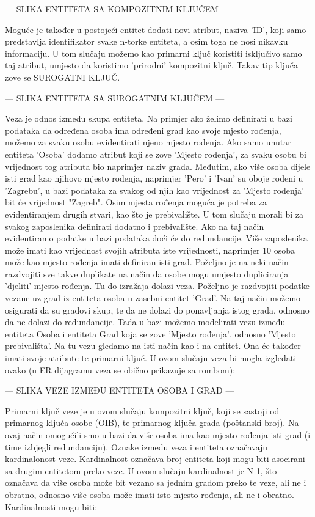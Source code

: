 \documentclass[times, utf8, zavrsni]{fer}
\begin{document}
--- SLIKA ENTITETA SA KOMPOZITNIM KLJUČEM ---

Moguće je također u postojeći entitet dodati novi atribut, naziva 'ID', koji samo predstavlja identifikator svake n-torke entiteta, a osim toga ne nosi nikavku informaciju. U tom slučaju možemo kao primarni ključ koristiti isključivo samo taj atribut, umjesto da koristimo 'prirodni' kompozitni ključ. Takav tip ključa zove se SUROGATNI KLJUČ.

--- SLIKA ENTITETA SA SUROGATNIM KLJUČEM ---

Veza je odnos između skupa entiteta.
Na primjer ako želimo definirati u bazi podataka da određena osoba ima određeni grad kao svoje mjesto rođenja, možemo za svaku osobu evidentirati njeno mjesto rođenja. Ako samo unutar entiteta 'Osoba' dodamo atribut koji se zove 'Mjesto rođenja', za svaku osobu bi vrijednost tog atributa bio naprimjer naziv grada. Međutim, ako više osoba dijele isti grad kao njihovo mjesto rođenja, naprimjer 'Pero' i 'Ivan' su oboje rođeni u 'Zagrebu', u bazi podataka za svakog od njih kao vrijednost za 'Mjesto rođenja' bit će vrijednost "Zagreb". 
Osim mjesta rođenja moguća je potreba za evidentiranjem drugih stvari, kao što je prebivalište. U tom slučaju morali bi za svakog zaposlenika definirati dodatno i prebivalište. Ako na taj način evidentiramo podatke u bazi podataka doći će do redundancije. Više zaposlenika može imati kao vrijednost svojih atributa iste vrijednosti, naprimjer 10 osoba može kao mjesto rođenja imati definiran isti grad. Poželjno je na neki način razdvojiti sve takve duplikate na način da osobe mogu umjesto dupliciranja 'djeliti' mjesto rođenja. 
Tu do izražaja dolazi veza. Poželjno je razdvojiti podatke vezane uz grad iz entiteta osoba u zasebni entitet 'Grad'. Na taj način možemo osigurati da su gradovi skup, te da ne dolazi do ponavljanja istog grada, odnosno da ne dolazi do redundancije. Tada u bazi možemo modelirati vezu između entiteta Osoba i entiteta Grad koja se zove 'Mjesto rođenja', odnosno 'Mjesto prebivališta'. Na tu vezu gledamo na isti način kao i na entitet. Ona će također imati svoje atribute te primarni ključ. U ovom slučaju veza bi mogla izgledati ovako (u ER dijagramu veza se obično prikazuje sa rombom):

--- SLIKA VEZE IZMEĐU ENTITETA OSOBA I GRAD ---

Primarni ključ veze je u ovom slučaju kompozitni ključ, koji se sastoji od primarnog ključa osobe (OIB), te primarnog ključa grada (poštanski broj). Na ovaj način omogućili smo u bazi da više osoba ima kao mjesto rođenja isti grad (i time izbjegli redundanciju). Oznake između veza i entiteta označavaju kardinalonost veze. Kardinalnost označava broj entiteta koji mogu biti asocirani sa drugim entitetom preko veze. U ovom slučaju kardinalnost je N-1, što označava da više osoba može bit vezano sa jednim gradom preko te veze, ali ne i obratno, odnosno više osoba može imati isto mjesto rođenja, ali ne i obratno. Kardinalnosti mogu biti:
\end{document}
